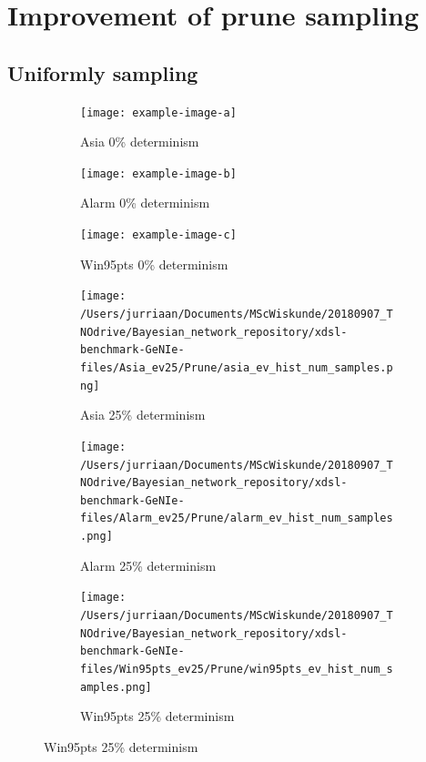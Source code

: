 \documentclass[a4paper, twoside, 11pt]{report}
\theoremstyle{plain}
\theoremstyle{definition}
\theoremstyle{remark}
\begin{document}
\chapter{Improvement of prune sampling}
\section{Uniformly sampling}
\begin{figure}[h!]
\centering

\begin{subfigure}{.33\linewidth}
\texttt{[image: example-image-a]}
\caption{Asia 0\% determinism}%
\label{asia_ev}%
\end{subfigure}\hfill%
\begin{subfigure}{.33\linewidth}
\texttt{[image: example-image-b]}
\caption{Alarm 0\% determinism}%
\label{alarm_ev}%
\end{subfigure}\hfill%
\begin{subfigure}{.33\linewidth}
\texttt{[image: example-image-c]}
\caption{Win95pts 0\% determinism}%
\label{win95pts_ev}%
\end{subfigure}\hfill%

\begin{subfigure}{.33\linewidth}
\texttt{[image: /Users/jurriaan/Documents/MScWiskunde/20180907\_TNOdrive/Bayesian\_network\_repository/xdsl-benchmark-GeNIe-files/Asia\_ev25/Prune/asia\_ev\_hist\_num\_samples.png]}
\caption{Asia 25\% determinism}%
\label{asia_ev}%
\end{subfigure}\hfill%
\begin{subfigure}{.33\linewidth}
\texttt{[image: /Users/jurriaan/Documents/MScWiskunde/20180907\_TNOdrive/Bayesian\_network\_repository/xdsl-benchmark-GeNIe-files/Alarm\_ev25/Prune/alarm\_ev\_hist\_num\_samples.png]}
\caption{Alarm 25\% determinism}%
\label{alarm_ev}%
\end{subfigure}\hfill%
\begin{subfigure}{.33\linewidth}
\texttt{[image: /Users/jurriaan/Documents/MScWiskunde/20180907\_TNOdrive/Bayesian\_network\_repository/xdsl-benchmark-GeNIe-files/Win95pts\_ev25/Prune/win95pts\_ev\_hist\_num\_samples.png]}
\caption{Win95pts 25\% determinism}%
\label{win95pts_ev}%
\end{subfigure}\hfill%


\end{figure}
\end{document}
